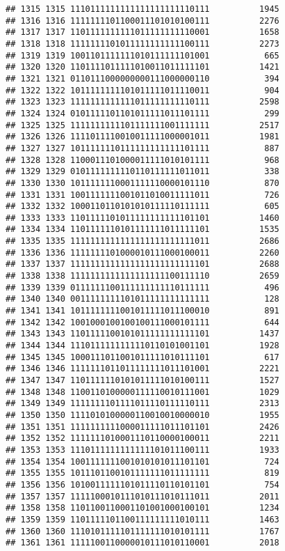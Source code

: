 \documentclass[]{article}
\begin{document}
\begin{verbatim}
## 1315 1315 1110111111111111111111110111          1945
## 1316 1316 1111111101100011101010100111          2276
## 1317 1317 1101111111111011111111110001          1658
## 1318 1318 1111111101011111111111100111          2273
## 1319 1319 1001101111111010111111101001           665
## 1320 1320 1101111011111010011011111101          1421
## 1321 1321 0110111000000000111000000110           394
## 1322 1322 1011111111101011111011110011           904
## 1323 1323 1111111111111011111111110111          2598
## 1324 1324 0101111101101011111011101111           299
## 1325 1325 1111111111101111111001111111          2517
## 1326 1326 1111011110010011111000001011          1981
## 1327 1327 1011111110111111111111101111           887
## 1328 1328 1100011101000011111010101111           968
## 1329 1329 0101111111110110111111011011           338
## 1330 1330 1011111110001111110000101110           870
## 1331 1331 1001111111001011010011111011           726
## 1332 1332 1000110110101010111110111111           605
## 1333 1333 1101111101011111111111101101          1460
## 1334 1334 1101111110101111111011111101          1535
## 1335 1335 1111111111111111111111111011          2686
## 1336 1336 1111111101000010111000100011          2260
## 1337 1337 1111111111111111111111111101          2688
## 1338 1338 1111111111111111111100111110          2659
## 1339 1339 0111111100111111111110111111           496
## 1340 1340 0011111111101011111111111111           128
## 1341 1341 1011111111001011111011100010           891
## 1342 1342 1001000100100100111000101111           644
## 1343 1343 1101111100101011111111111101          1437
## 1344 1344 1110111111111110110101001101          1928
## 1345 1345 1000111011001011111010111101           617
## 1346 1346 1111111011011111111011101001          2221
## 1347 1347 1101111110101011111010100111          1527
## 1348 1348 1100110100000111110010111001          1029
## 1349 1349 1111111101111011110111110111          2313
## 1350 1350 1111010100000110010010000010          1955
## 1351 1351 1111111111000011111011101101          2426
## 1352 1352 1111111010001110110000100011          2211
## 1353 1353 1110111111111111101011100111          1933
## 1354 1354 1001111111001010101011101101           724
## 1355 1355 1011101100101111111011111111           819
## 1356 1356 1010011111101011110110101101           754
## 1357 1357 1111100010111010111010111011          2011
## 1358 1358 1101100110001101001000100101          1234
## 1359 1359 1101111101100111111111010111          1463
## 1360 1360 1110101111101111111010101111          1767
## 1361 1361 1111100110000010111010110001          2018

\end{verbatim}
\end{document}
